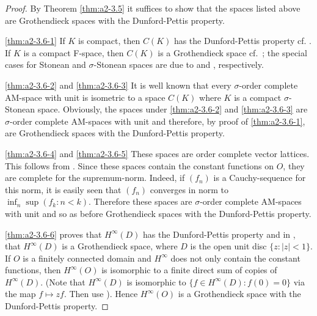 \begin{proof}
By Theorem \ref{thm:a2-3.5}   it suffices to show that the spaces listed above are Grothendieck spaces with the Dunford-Pettis property.

\ref{thm:a2-3.6-1} If $K$ is compact, then $C(K)$ has the Dunford-Pettis property cf. \citet[Théorème 4]{grothendieck:1953}.
If $K$ is a compact F-space, then $C(K)$ is a Grothendieck space cf.~\citet[Theorem 2.5]{seever:1973}; 
the special cases for Stonean and $\sigma$-Stonean spaces are due to \citet[Théorème 9]{grothendieck:1953} and \citet{ando:1961},  respectively.
 
\ref{thm:a2-3.6-2} and \ref{thm:a2-3.6-3} \quad It is well known that every $\sigma$-order complete AM-space with unit is isometric to a space $C(K)$ where $K$ is a compact $\sigma$-Stonean space.
Obviously, the spaces under 
\ref{thm:a2-3.6-2}   and \ref{thm:a2-3.6-3}  are $\sigma$-order complete AM-spaces with unit and therefore, by 
proof of \ref{thm:a2-3.6-1}, are  Grothendieck spaces with the Dunford-Pettis property.
 
\ref{thm:a2-3.6-4} and \ref{thm:a2-3.6-5} \quad
These spaces are order complete vector lattices.
This follows from \citet[pp.18-22, Standardbeispiele 1 and 2 p.55]{bauer:1966}.
Since these spaces contain the constant functions on $O$, they are complete for the supremum-norm.
Indeed, if $(f_n)$ is a Cauchy-sequence for this norm, it is easily seen that $(f_n)$ converges in norm to $\inf_n \sup(f_k \colon n < k)$.
Therefore these spaces are $\sigma$-order complete AM-spaces with unit and so as before Grothendieck spaces with the Dunford-Pettis property.

\ref{thm:a2-3.6-6}
\citet[Corollary 3]{bourgain:1980} proves that $H^{\infty}(D)$ has the Dunford-Pettis property and in \citet[Proposition III.1]{Bourgain:1985}, that $H^{\infty}(D)$ is a
Grothendieck space, where $D$ is the open unit disc $\{z \colon |z| < 1\}$.
If $O$ is a finitely connected domain and $H^{\infty}$ does not only contain the constant functions, then $H^{\infty}(O)$ is isomorphic to a finite direct sum of copies of $H^{\infty}(D)$.
(Note that $H^{\infty}(D)$ is isomorphic to $\{f \in H^{\infty}(D) \colon f(0) = 0\}$ via the map $f \mapsto zf$.
Then use \citet[p.77 and Proposition 4.4.1]{grothendieck:1953} ).
Hence $H^{\infty}(O)$ is a Grothendieck space with the Dunford-Pettis property.
\end{proof}

